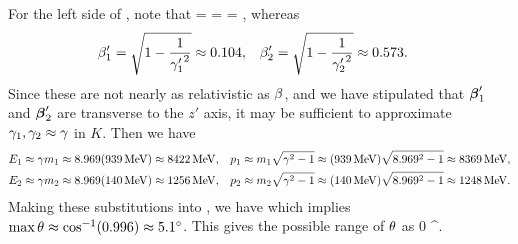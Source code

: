 \begin{solution}
	For the left side of , note that
	\beq
		\gam = 
		= \frac{\ELam}{\mLam}
		\approx \gamLam
		\qimplies
		\bet = 
		,
	\eeq
	whereas
	\begin{align*}
		\beta_1' &= \sqrt{1 - \frac{1}{{\gamma_1'}^2}}
		\approx 0.104, &
		\beta_2' &= \sqrt{1 - \frac{1}{{\gamma_2'}^2}}
		\approx 0.573. &
	\end{align*}
	Since these are not nearly as relativistic as $\beta$, and we have stipulated that $\boldsymbol{\beta}'_1$ and $\boldsymbol{\beta}'_2$ are transverse to the $z'$ axis, it may be sufficient to approximate $\gamma_1, \gamma_2 \approx \gamma$ in $K$.  Then we have
	\begin{align*}
		\Eq &\approx \gam \mq
		\approx \gamLam (\mnuc)
		\approx \Enuc, &
		\pq &\approx \mq \sqrt{\gam^2 - 1}
		\approx (\mnuc) \sqrt{\gamLam^2 - 1}
		\approx \pnuc, \\
		\Ew &\approx \gam \mw
		\approx \gamLam (\mpi)
		\approx \Epi, &
		\pw &\approx \mw \sqrt{\gam^2 - 1}
		\approx (\mpi) \sqrt{\gamLam^2 - 1}
		\approx \ppi.
	\end{align*}
	Making these substitutions into , we have
	\beq
		\cos\tht \approx {}
	\eeq
	which implies $\max\theta \approx \cos[-1](0.996) \approx 5.1^\circ$.  This gives the possible range of $\theta$ as
	\beq
		{\color{blue} 0 \leq \tht {}^\circ}.
	\eeq
\end{solution}
\vfix